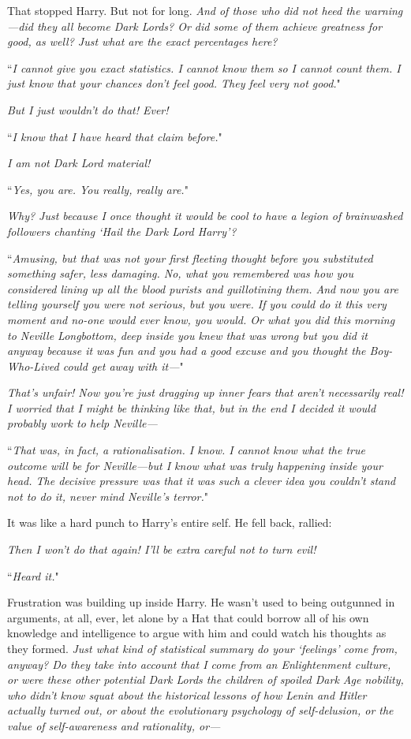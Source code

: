 That stopped Harry. But not for long. \emph{And of those who did \emph{not} heed the warning—did they \emph{all} become Dark Lords? Or did some of them achieve greatness for good, as well? Just what are the exact percentages here?}

``\emph{I cannot give you exact statistics. I cannot know them so I cannot count them. I just know that your chances don't feel good. They feel \emph{very} not good.}"

\emph{But I just wouldn't do that! Ever!}

``\emph{I know that I have heard that claim before.}"

\emph{I am not Dark Lord material!}

``\emph{Yes, you are. You really, \emph{really} are.}"

\emph{Why? Just because I once thought it would be cool to have a legion of brainwashed followers chanting `Hail the Dark Lord Harry'?}

``\emph{Amusing, but that was not your first fleeting thought before you substituted something safer, less damaging. No, what you remembered was how you considered lining up all the blood purists and guillotining them. And now you are telling yourself you were not serious, but you were. If you could do it this very moment and no-one would ever know, you would. Or what you did this morning to Neville Longbottom, deep inside you \emph{knew} that was wrong but you did it \emph{anyway} because it was \emph{fun} and you had a \emph{good excuse} and you thought the Boy-Who-Lived could \emph{get away} with it—}"

\emph{That's unfair! Now you're just dragging up inner fears that \emph{aren't} necessarily real! I \emph{worried} that I \emph{might} be thinking like that, but in the end I decided it would probably \emph{work} to help Neville—}

``\emph{That was, in fact, a rationalisation. I know. I cannot know what the true outcome will be for Neville—but I know what was truly happening inside your head. The decisive pressure was that it was such a clever idea you couldn't stand \emph{not} to do it, never mind Neville's terror.}"

It was like a hard punch to Harry's entire self. He fell back, rallied:

\emph{Then I won't do that again! I'll be extra careful not to turn evil!}

``\emph{Heard it.}"

Frustration was building up inside Harry. He wasn't used to being outgunned in arguments, at all, ever, let alone by a Hat that could borrow all of his own knowledge and intelligence to argue with him and could watch his thoughts as they formed. \emph{Just what kind of statistical summary do your `feelings' come from, anyway? Do they take into account that I come from an Enlightenment culture, or were these other potential Dark Lords the children of spoiled Dark Age nobility, who didn't know squat about the historical lessons of how Lenin and Hitler actually turned out, or about the evolutionary psychology of self-delusion, or the value of self-awareness and rationality, or—}

